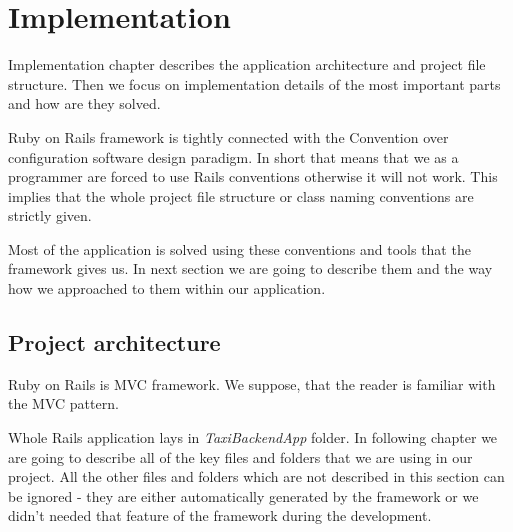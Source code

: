\chapter{Implementation}
Implementation chapter describes the application architecture and project file structure. Then we focus on implementation details of the most important parts and how are they solved.

Ruby on Rails framework is tightly connected with the Convention over configuration software design paradigm. In short that means that we as a programmer are forced to use Rails conventions otherwise it will not work. This implies that the whole project file structure or class naming conventions are strictly given. 

Most of the application is solved using these conventions and tools that the framework gives us. In next section we are going to describe them and the way how we approached to them within our application.

\section {Project architecture}
	Ruby on Rails is MVC framework. We suppose, that the reader is familiar with the MVC  pattern.
	
	Whole Rails application lays in \textit{TaxiBackendApp} folder. In following chapter we are going to describe all of the key files and folders that we are using in our project. All the other files and folders which are not described in this section can be ignored - they are either automatically generated by the framework or we didn't needed that feature of the framework during the development.
	
